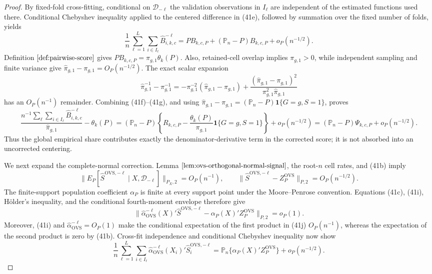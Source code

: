 \documentclass{article}
\begin{document}
\begin{proof}
By fixed-fold cross-fitting, conditional on \(\mathcal D_{-\ell}\) the validation observations in \(I_\ell\) are independent of the estimated functions used there.  Conditional Chebyshev inequality applied to the centered difference in (41e), followed by summation over the fixed number of folds, yields
\[
\frac1n\sum_{\ell=1}^L\sum_{i\in I_\ell}
\widehat B_{i,k,c}^{-\ell}
=P B_{k,c,P}+(\mathbb P_n-P)B_{k,c,P}+o_P(n^{-1/2}).
\tag{41f}
\]
Definition \(\ref{def:pairwise-score}\) gives \(P B_{k,c,P}=\pi_{g,1}\theta_k(P)\).  Also, retained-cell overlap implies \(\pi_{g,1}>0\), while independent sampling and finite variance give \(\widehat\pi_{g,1}-\pi_{g,1}=O_P(n^{-1/2})\).  The exact scalar expansion
\[
\widehat\pi_{g,1}^{-1}-\pi_{g,1}^{-1}
=-\pi_{g,1}^{-2}(\widehat\pi_{g,1}-\pi_{g,1})
+\frac{(\widehat\pi_{g,1}-\pi_{g,1})^2}
{\pi_{g,1}^2\widehat\pi_{g,1}}
\tag{41g}
\]
has an \(O_P(n^{-1})\) remainder.  Combining (41f)--(41g), and using
\(\widehat\pi_{g,1}-\pi_{g,1}=(\mathbb P_n-P)\mathbf 1\{G=g,S=1\}\), proves
\[
\frac{n^{-1}\sum_{\ell}\sum_{i\in I_\ell}\widehat B_{i,k,c}^{-\ell}}
{\widehat\pi_{g,1}}-\theta_k(P)
=(\mathbb P_n-P)\left\{
R_{k,c,P}-\frac{\theta_k(P)}{\pi_{g,1}}\mathbf 1\{G=g,S=1\}
\right\}+o_P(n^{-1/2})
=(\mathbb P_n-P)\Psi_{k,c,P}+o_P(n^{-1/2}).
\tag{41h}
\]
Thus the global empirical share contributes exactly the denominator-derivative term in the corrected score; it is not absorbed into an uncorrected centering.

We next expand the complete-normal correction.  Lemma \(\ref{lem:ovs-orthogonal-normal-signal}\), the root-\(n\) cell rates, and (41b) imply
\[
\|E_P[\widehat S^{\mathrm{OVS},-\ell}\mid X,\mathcal D_{-\ell}]\|_{P_X,2}
=O_P(n^{-1}),
\qquad
\|\widehat S^{\mathrm{OVS},-\ell}-Z_P^{\mathrm{OVS}}\|_{P,2}=O_P(n^{-1/2}).
\tag{41i}
\]
The finite-support population coefficient \(\alpha_P\) is finite at every support point under the Moore--Penrose convention.  Equations (41c), (41i), H\"older's inequality, and the conditional fourth-moment envelope therefore give
\[
\|\widehat\alpha_{\mathrm{OVS}}^{-\ell}(X)'
\widehat S^{\mathrm{OVS},-\ell}
-\alpha_P(X)'Z_P^{\mathrm{OVS}}\|_{P,2}=o_P(1).
\tag{41j}
\]
Moreover, (41i) and \(\widehat\alpha_{\mathrm{OVS}}^{-\ell}=O_P(1)\) make the conditional expectation of the first product in (41j) \(O_P(n^{-1})\), whereas the expectation of the second product is zero by (41b).  Cross-fit independence and conditional Chebyshev inequality now show
\[
\frac1n\sum_{\ell=1}^L\sum_{i\in I_\ell}
\widehat\alpha_{\mathrm{OVS}}^{-\ell}(X_i)'
\widehat S_i^{\mathrm{OVS},-\ell}
=\mathbb P_n\{\alpha_P(X)'Z_P^{\mathrm{OVS}}\}+o_P(n^{-1/2}).
\tag{41k}
\]


\end{proof}
\end{document}
